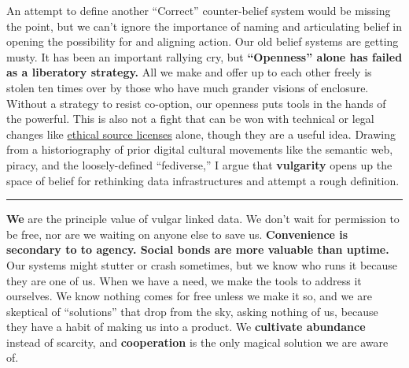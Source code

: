 An attempt to define another ``Correct'' counter-belief system would be
missing the point, but we can't ignore the importance of naming and
articulating belief in opening the possibility for and aligning
action. Our old
belief systems are getting musty. It has been an important rallying cry,
but \textbf{``Openness'' alone has failed as a liberatory strategy.} All
we make and offer up to each other freely is stolen ten times over by
those who have much grander visions of enclosure. Without a strategy to
resist co-option, our openness puts tools in the hands of the powerful.
This is also not a fight that can be won with technical or legal changes
like \href{https://ethicalsource.dev/licenses/}{ethical source licenses}
alone, though they are a useful idea. Drawing from a historiography of
prior digital cultural movements like the semantic web, piracy, and the
loosely-defined ``fediverse,'' I argue that
\textbf{vulgarity} opens up the space of belief for rethinking data
infrastructures and attempt a rough definition.

\begin{center}\rule{0.5\linewidth}{0.5pt}\end{center}

\textbf{We} are the principle value of vulgar linked data. We don't wait
for permission to be free, nor are we waiting on anyone else to save us.
\textbf{Convenience is secondary to to agency. Social bonds are more
valuable than uptime.} Our systems might stutter or crash sometimes, but
we know who runs it because they are one of us. When we have a need, we
make the tools to address it ourselves. We know nothing comes for free
unless we make it so, and we are skeptical of ``solutions'' that drop
from the sky, asking nothing of us, because they have a habit of making
us into a product. We \textbf{cultivate abundance} instead of scarcity,
and \textbf{cooperation} is the only magical solution we are aware of.

